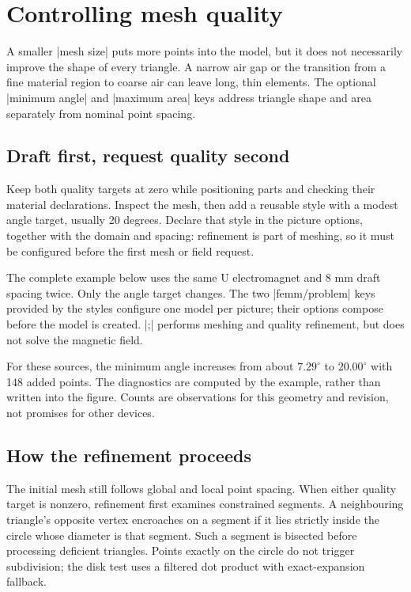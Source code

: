 \section{Controlling mesh quality}
\label{sec:mesh-quality}
A smaller |mesh size| puts more points into the model, but it does not
necessarily improve the shape of every triangle. A narrow air gap or the
transition from a fine material region to coarse air can leave long, thin
elements. The optional |minimum angle| and |maximum area| keys address
triangle shape and area separately from nominal point spacing.

\subsection{Draft first, request quality second}
Keep both quality targets at zero while positioning parts and checking their
material declarations. Inspect the mesh, then add a reusable style with a
modest angle target, usually 20 degrees. Declare that style in the picture
options, together with the domain and spacing: refinement is part of meshing,
so it must be configured before the first mesh or field request.

The complete example below uses the same U electromagnet and 8 mm draft
spacing twice. Only the angle target changes. The two |femm/problem| keys
provided by the styles configure one model per picture; their options compose
before the model is created. |;| performs meshing and quality
refinement, but does not solve the magnetic field.

For these sources, the minimum angle increases from about $7.29^\circ$ to
$20.00^\circ$ with 148 added points. The diagnostics are computed by the
example, rather than written into the figure. Counts are observations for
this geometry and revision, not promises for other devices.

\subsection{How the refinement proceeds}
The initial mesh still follows global and local point spacing. When either
quality target is nonzero, refinement first examines constrained segments.
A neighbouring triangle's opposite vertex encroaches on a segment if it lies
strictly inside the circle whose diameter is that segment. Such a segment
is bisected before processing deficient triangles. Points exactly on the
circle do not trigger subdivision; the disk test uses a filtered dot product
with exact-expansion fallback.

